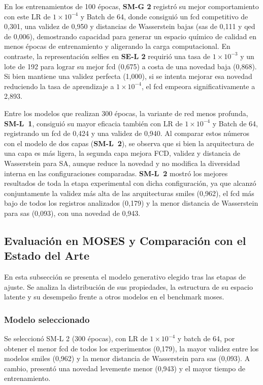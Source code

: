 En los entrenamientos de 100 épocas, \textbf{SM-G 2} registró su mejor comportamiento con este LR de $1 \times 10^{-4}$ y Batch de 64, donde consiguió un \gls{fcd} competitivo de 0,301, una validez de 0,950 y distancias de Wasserstein bajas (\gls{sas} de 0,111 y \gls{qed} de 0,006), demostrando capacidad para generar un espacio químico de calidad en menos épocas de entrenamiento y aligerando la carga computacional. En contraste, la representación \gls{selfies} en \textbf{SE-L 2} requirió una tasa de $1 \times 10^{-3}$ y un lote de 192 para lograr su mejor \gls{fcd} (0,675) a costa de una novedad baja (0,868). Si bien mantiene una validez perfecta (1,000), si se intenta mejorar esa novedad reduciendo la tasa de aprendizaje a $1 \times 10^{-4}$, el \gls{fcd} empeora significativamente a 2,893.

Entre los modelos que realizan 300 épocas, la variante de red menos profunda, \textbf{SM-L~1}, consiguió su mayor eficacia también con LR de $1 \times 10^{-4}$ y Batch de 64, registrando un \gls{fcd} de 0,424 y una validez de 0,940. Al comparar estos números con el modelo de dos capas (\textbf{SM-L~2}), se observa que si bien la arquitectura de una capa es más ligera, la segunda capa mejora FCD, validez y distancia de Wasserstein para SA, aunque reduce la novedad y no modifica la diversidad interna en las configuraciones comparadas. \textbf{SM-L~2} mostró los mejores resultados de toda la etapa experimental con dicha configuración, ya que alcanzó conjuntamente la validez más alta de las arquitecturas \gls{smiles} (0,962), el \gls{fcd} más bajo de todos los registros analizados (0,179) y la menor distancia de Wasserstein para \gls{sas} (0,093), con una novedad de 0,943.

\subsection{Evaluación en MOSES y Comparación con el Estado del Arte}
\label{subsec:res_vae_moses}

En esta subsección se presenta el modelo generativo elegido tras las etapas de ajuste. Se analiza la distribución de sus propiedades, la estructura de su espacio latente y su desempeño frente a otros modelos en el benchmark \gls{moses}.

\subsubsection{Modelo seleccionado}

Se seleccionó SM-L 2 (300 épocas), con LR de $1 \times 10^{-4}$ y batch de 64, por obtener el menor \gls{fcd} de todos los experimentos (0,179), la mayor validez entre los modelos \gls{smiles} (0,962) y la menor distancia de Wasserstein para \gls{sas} (0,093). A cambio, presentó una novedad levemente menor (0,943) y el mayor tiempo de entrenamiento.

